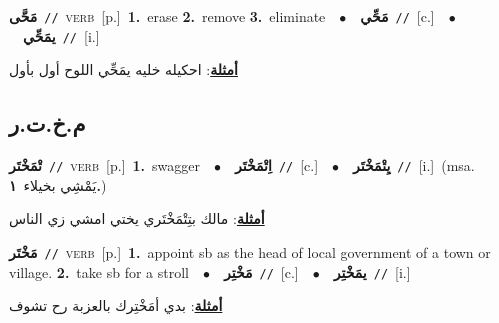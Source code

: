 \documentclass[10pt,a4paper,twoside]{article} %
\begin{document}
\begin{multicols}{2}
{\setlength\topsep{0pt}\textbf{\foreignlanguage{arabic}{مَحَّى}}\ {\color{gray}\texttt{//}\color{black}}\ \textsc{verb}\ [p.]\ \textbf{1.}~erase  \textbf{2.}~remove  \textbf{3.}~eliminate\ \ $\bullet$\ \ \setlength\topsep{0pt}\textbf{\foreignlanguage{arabic}{مَحِّي}}\ {\color{gray}\texttt{//}\color{black}}\ [c.]\ \ $\bullet$\ \ \setlength\topsep{0pt}\textbf{\foreignlanguage{arabic}{يمَحِّي}}\ {\color{gray}\texttt{//}\color{black}}\ [i.]\  \begin{flushright}\color{gray}\foreignlanguage{arabic}{\textbf{\underline{\foreignlanguage{arabic}{أمثلة}}}: احكيله خليه يمَحِّي اللوح أول بأول}\end{flushright}\color{black}} \vspace{2mm}

\vspace{-3mm}
\subsection*{\color{blue}\foreignlanguage{arabic}{م.خ.ت.ر}\color{blue}{}} 

{\setlength\topsep{0pt}\textbf{\foreignlanguage{arabic}{تْمَخْتَر}}\ {\color{gray}\texttt{//}\color{black}}\ \textsc{verb}\ [p.]\ \textbf{1.}~swagger\ \ $\bullet$\ \ \setlength\topsep{0pt}\textbf{\foreignlanguage{arabic}{اِتْمَخْتَر}}\ {\color{gray}\texttt{//}\color{black}}\ [c.]\ \ $\bullet$\ \ \setlength\topsep{0pt}\textbf{\foreignlanguage{arabic}{يِتْمَخْتَر}}\ {\color{gray}\texttt{//}\color{black}}\ [i.]\ \color{gray}(msa. \foreignlanguage{arabic}{يَمْشِي بخيلاء}~\foreignlanguage{arabic}{\textbf{١.}})\color{black}\  \begin{flushright}\color{gray}\foreignlanguage{arabic}{\textbf{\underline{\foreignlanguage{arabic}{أمثلة}}}: مالك بتِتْمَخْتَري يختي امشي زي الناس}\end{flushright}\color{black}} \vspace{2mm}

{\setlength\topsep{0pt}\textbf{\foreignlanguage{arabic}{مَخْتَر}}\ {\color{gray}\texttt{//}\color{black}}\ \textsc{verb}\ [p.]\ \textbf{1.}~appoint sb as the head of local government of a town or village.  \textbf{2.}~take sb for a stroll\ \ $\bullet$\ \ \setlength\topsep{0pt}\textbf{\foreignlanguage{arabic}{مَخْتِر}}\ {\color{gray}\texttt{//}\color{black}}\ [c.]\ \ $\bullet$\ \ \setlength\topsep{0pt}\textbf{\foreignlanguage{arabic}{يمَخْتِر}}\ {\color{gray}\texttt{//}\color{black}}\ [i.]\  \begin{flushright}\color{gray}\foreignlanguage{arabic}{\textbf{\underline{\foreignlanguage{arabic}{أمثلة}}}: بدي أمَخْتِرك بالعزبة رح تشوف}\end{flushright}\color{black}} \vspace{2mm}


\end{multicols}
\end{document}
